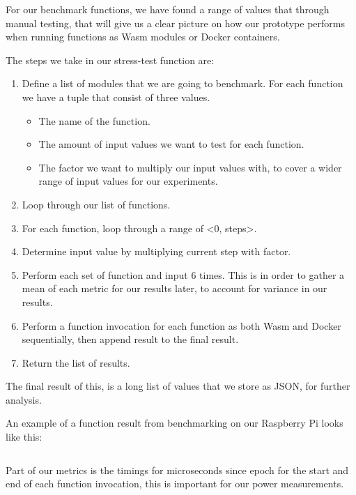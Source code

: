\documentclass[
  table]{report}
\providecommand{\tightlist}{%
  \setlength{\itemsep}{0pt}\setlength{\parskip}{0pt}}
\begin{document}
\inputminted{rust}{assets/code/request.rs}

For our benchmark functions, we have found a range of values that
through manual testing, that will give us a clear picture on how our
prototype performs when running functions as \ac{Wasm} modules or Docker
containers.

The steps we take in our stress-test function are:

\begin{enumerate}
\def\labelenumi{\arabic{enumi}.}
\tightlist
\item
  Define a list of modules that we are going to benchmark. For each
  function we have a tuple that consist of three values.

  \begin{itemize}
  \tightlist
  \item
    The name of the function.
  \item
    The amount of input values we want to test for each function.\\
  \item
    The factor we want to multiply our input values with, to cover a
    wider range of input values for our experiments.
  \end{itemize}
\item
  Loop through our list of functions.
\item
  For each function, loop through a range of \textless0,
  steps\textgreater.
\item
  Determine input value by multiplying current step with factor.
\item
  Perform each set of function and input 6 times. This is in order to
  gather a mean of each metric for our results later, to account for
  variance in our results.
\item
  Perform a function invocation for each function as both Wasm and
  Docker sequentially, then append result to the final result.
\item
  Return the list of results.
\end{enumerate}

The final result of this, is a long list of values that we store as
JSON, for further analysis.

An example of a function result from benchmarking on our Raspberry Pi
looks like this:

\inputminted{json}{assets/code/result_example.json}

Part of our metrics is the timings for microseconds since epoch for the
start and end of each function invocation, this is important for our
power measurements.
\end{document}
